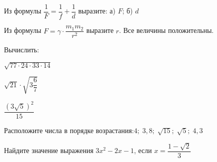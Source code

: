 \begin{listofex}
	\item Из формулы \( \dfrac{1}{F}=\dfrac{1}{f}+\dfrac{1}{d} \) выразите: а) \( F \); б) \( d \)
	
	\item Из формулы \( F=\gamma\cdot\dfrac{m_1m_2}{r^2} \) выразите \( r \). Все величины положительны.
	
	\item Вычислить:
	\begin{enumcols}[itemcolumns=3]
		\item \( \sqrt{77\cdot24\cdot33\cdot14} \)
		\item \( \sqrt{21}\cdot\sqrt{3\dfrac{6}{7}} \)
		\item \( \dfrac{(3\sqrt{5})^2}{15} \)
	\end{enumcols}
	
	\item Расположите числа в порядке возрастания:\quad\( 4;\;3,8;\;\sqrt{15};\;\sqrt{5};\;4,3 \)
	
	\item Найдите значение выражения \( 3x^2-2x-1 \), если \( x=\dfrac{1-\sqrt{2}}{3} \)
\end{listofex}